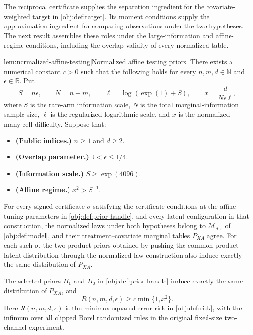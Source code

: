 \documentclass[11pt]{article}
\begin{document}
The reciprocal certificate supplies the separation ingredient for the covariate-weighted target in \cref{obj:def:target}. Its moment conditions supply the approximation ingredient for comparing observations under the two hypotheses. The next result assembles these roles under the large-information and affine-regime conditions, including the overlap validity of every normalized table.

\begin{lemmav}{lem:normalized-affine-testing}[Normalized affine testing priors]
There exists a numerical constant \(c>0\) such that the following holds for every \(n,m,d\in\mathbb N\) and \(\epsilon\in\mathbb R\). Put
\[
S=n\epsilon,\qquad N=n+m,\qquad
\ell=\log(\exp(1)+S),\qquad x=\frac{d}{N\epsilon\ell},
\]
where \(S\) is the rare-arm information scale, \(N\) is the total marginal-information sample size, \(\ell\) is the regularized logarithmic scale, and \(x\) is the normalized many-cell difficulty. Suppose that:
\begin{itemize}
\item \textbf{(Public indices.)} \(n\ge1\) and \(d\ge2\).
\item \textbf{(Overlap parameter.)} \(0<\epsilon\le1/4\).
\item \textbf{(Information scale.)} \(S\ge\exp(4096)\).
\item \textbf{(Affine regime.)} \(x^2>S^{-1}\).
\end{itemize}
For every signed certificate \(\sigma\) satisfying the certificate conditions at the affine tuning parameters in \cref{obj:def:prior-handle}, and every latent configuration in that construction, the normalized laws under both hypotheses belong to \(\mathcal M_{d,\epsilon}\) of \cref{obj:def:model}, and their treatment--covariate marginal tables \(P_{XA}\) agree. For each such \(\sigma\), the two product priors obtained by pushing the common product latent distribution through the normalized-law construction also induce exactly the same distribution of \(P_{XA}\).

The selected priors \(\Pi_1\) and \(\Pi_0\) in \cref{obj:def:prior-handle} induce exactly the same distribution of \(P_{XA}\), and
\[
R(n,m,d,\epsilon)\ge c\min\{1,x^2\}.
\]
Here \(R(n,m,d,\epsilon)\) is the minimax squared-error risk in \cref{obj:def:risk}, with the infimum over all clipped Borel randomized rules in the original fixed-size two-channel experiment.
\end{lemmav}
\end{document}
